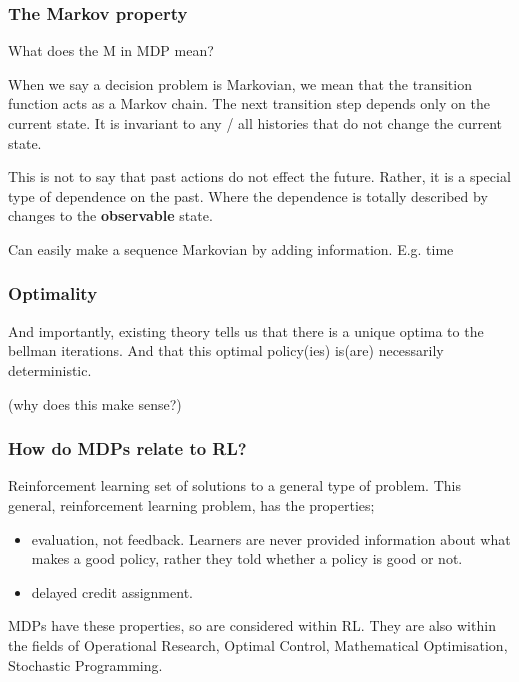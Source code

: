 \hypertarget{the-markov-property}{%
\subsubsection{The Markov property}\label{the-markov-property}}

What does the M in MDP mean?

When we say a decision problem is Markovian, we mean that the transition
function acts as a Markov chain. The next transition step depends only
on the current state. It is invariant to any / all histories that do not
change the current state.

This is not to say that past actions do not effect the future. Rather,
it is a special type of dependence on the past. Where the dependence is
totally described by changes to the \textbf{observable} state.

Can easily make a sequence Markovian by adding information. E.g.
time

\hypertarget{optimality}{%
\subsubsection{Optimality}\label{optimality}}

And importantly, existing theory tells us that there is a unique optima to the bellman iterations.
And that this optimal policy(ies) is(are) necessarily deterministic.


(why does this make sense?)

\hypertarget{how-do-mdps-relate-to-rl}{%
\subsubsection{How do MDPs relate to RL?}\label{how-do-mdps-relate-to-rl}}

Reinforcement learning set of solutions to a general type of problem.
This general, reinforcement learning problem, has the properties;

\begin{itemize}
\tightlist
\item
  evaluation, not feedback. Learners are never provided information
  about what makes a good policy, rather they told whether a policy is
  good or not.
\item
  delayed credit assignment.
\end{itemize}

MDPs have these properties, so are considered within RL. They are also
within the fields of Operational Research, Optimal Control, Mathematical
Optimisation, Stochastic Programming.

